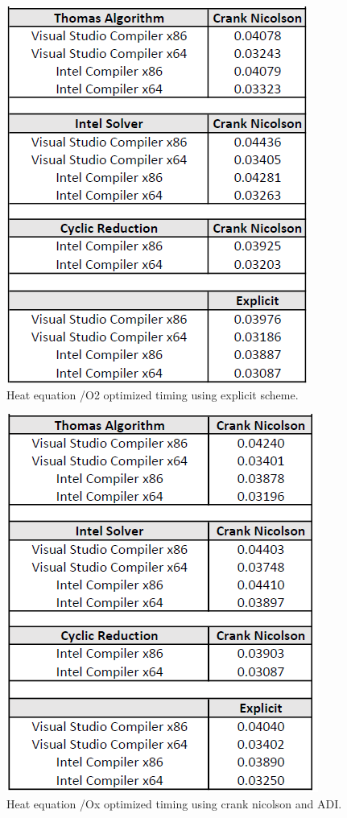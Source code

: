 \documentclass[12pt, oneside]{book}
\theoremstyle{plain}
\theoremstyle{definition}
\begin{document}
\begin{figure}[!htb]
    \centering
        \includegraphics[scale=0.7]{bs2Optimized.png}
    \caption{Heat equation  /O2 optimized timing using explicit scheme.}
\end{figure}
\begin{figure}[!htb]
    \centering
        \includegraphics[scale=0.6]{bsXOptimized.png}
    \caption{Heat equation  /Ox optimized timing using crank nicolson and ADI.}
\end{figure}
\end{document}
